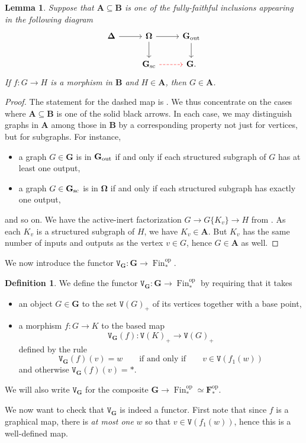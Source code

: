 \documentclass{amsart}
\numberwithin{theorem}{subsection}
\newtheorem{lemma}[theorem]{Lemma}
\theoremstyle{definition}
\newtheorem{definition}[theorem]{Definition}
\providecommand{\op}{\mathrm{op}}
\newcommand{\finset}{\operatorname{Fin}}
\newcommand{\pfinset}{\finset_*}
\newcommand{\finsetskel}{\mathbf{F}}
\newcommand{\pfinsetskel}{\finsetskel_*}
\newcommand{\name}[1]{\ensuremath{\text{\textup{#1}}}}
\newcommand{\simp}{\mathbf{\Delta}}
\newcommand{\bbO}{\mathbf{\Omega}}
\newcommand{\bbY}{\mathbf{G}}
\newcommand{\bbYout}{\bbY_{\name{out}}}
\newcommand{\vertex}{\mathtt{V}}
\begin{document}
\begin{lemma}\label{lem comparison between dirgraph cats}
Suppose that $\mathbf{A} \subseteq \mathbf{B}$ is one of the fully-faithful inclusions appearing in the following diagram
\[ \begin{tikzcd}
\simp \rar & \bbO \rar \dar & \bbYout \dar  \\
& \bbY_{\name{sc}} \rar[dashed, color=red] & \bbY. 
\end{tikzcd} \]
If $f \colon G \to H$ is a morphism in $\mathbf{B}$ and $H \in \mathbf{A}$, then $G\in \mathbf{A}$.
\end{lemma}
\begin{proof}
The statement for the {\color{red} dashed} map is \cite[Proposition 5.2.8]{hrybook}.
We thus concentrate on the cases where $\mathbf{A} \subseteq \mathbf{B}$ is one of the solid black arrows.
In each case, we may distinguish graphs in $\mathbf{A}$ among those in $\mathbf{B}$ by a corresponding property not just for vertices, but for subgraphs.
For instance, 
\begin{itemize}
	\item a graph $G\in \bbY$ is in $\bbYout$ if and only if each structured subgraph of $G$ has at least one output,
	\item a graph $G\in \bbY_{\name{sc}}$ is in $\bbO$ if and only if each structured subgraph has exactly one output,
\end{itemize}
and so on.
We have the active-inert factorization $G\to G\{K_v\} \to H$ from \cite[Lemma 6.42]{hrybook}.
As each $K_v$ is a structured subgraph of $H$, we have $K_v \in \mathbf{A}$.
But $K_v$ has the same number of inputs and outputs as the vertex $v\in G$, hence $G\in \mathbf{A}$ as well.
\end{proof}

We now introduce the functor $\vertex_\bbY\colon\bbY \to \pfinset^\op$.
\begin{definition}\label{definition bbY to Fin}
	We define the functor $\vertex_\bbY\colon\bbY \to \pfinset^\op$ by requiring that it takes 
	\begin{itemize}
		\item an object $G\in \bbY$ to the set $\vertex(G)_+$ of its vertices together with a base point, 
		\item a morphism $f\colon G\to K$ to the based map
		\[
		\vertex_\bbY(f)\colon\vertex(K)_+ \rightarrow \vertex(G)_+
		\]
		defined by the rule
		\begin{equation}\label{definition of partial map}
		\vertex_\bbY(f)(v) = w \qquad \text{if and only if} \qquad v \in \vertex(f_1(w))
		\end{equation}
		and otherwise $\vertex_\bbY(f)(v)=*$.
	\end{itemize}
	We will also write $\vertex_\bbY$ for the composite $\bbY\to \pfinset^\op\simeq \pfinsetskel^\op$.
\end{definition}
We now want to check that $\vertex_\bbY$ is indeed a functor. First note that since $f$ is a graphical map, there is \emph{at most one} $w$ so that $v \in \vertex({f_1(w)})$, hence this is a well-defined map.
\end{document}
